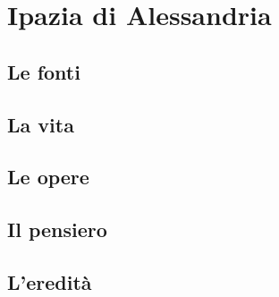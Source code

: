 \chapter{Ipazia di Alessandria}

\section{Le fonti}

\section{La vita}

\section{Le opere}

\section{Il pensiero}

\section{L'eredità}
